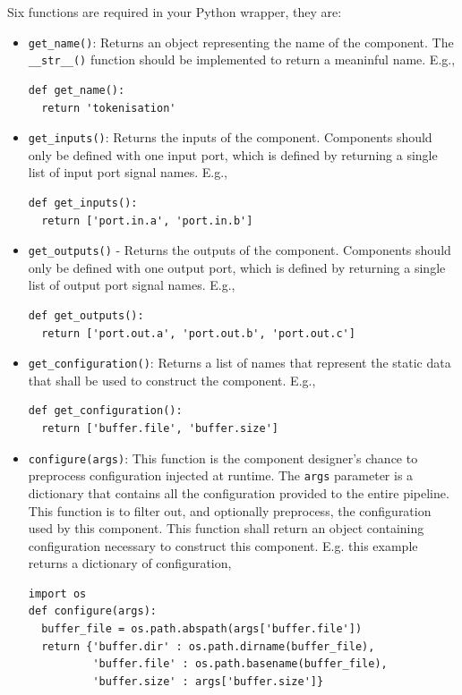 Six functions are required in your Python wrapper, they are:
\begin{itemize}
\item \texttt{get\_name()}: Returns an object representing the name of the component. The \texttt{\_\_str\_\_()} function should be implemented to return a meaninful name. E.g.,
\begin{verbatim}
def get_name():
  return 'tokenisation'
\end{verbatim}
\item \texttt{get\_inputs()}: Returns the inputs of the component. Components should only be defined with one input port, which is defined by returning a single list of input port signal names. E.g.,
\begin{verbatim}
def get_inputs():
  return ['port.in.a', 'port.in.b']
\end{verbatim}
\item \texttt{get\_outputs()} - Returns the outputs of the component. Components should only be defined with one output port, which is defined by returning a single list of output port signal names. E.g.,
\begin{verbatim}
def get_outputs():
  return ['port.out.a', 'port.out.b', 'port.out.c']
\end{verbatim}
\item \texttt{get\_configuration()}: Returns a list of names that represent the static data that shall be used to construct the component. E.g.,
\begin{verbatim}
def get_configuration():
  return ['buffer.file', 'buffer.size']
\end{verbatim}
\item \texttt{configure(args)}: This function is the component designer's chance to preprocess configuration injected at runtime. The \texttt{args} parameter is a dictionary that contains all the configuration provided to the entire pipeline. This function is to filter out, and optionally preprocess, the configuration used by this component. This function shall return an object containing configuration necessary to construct this component. E.g. this example returns a dictionary of configuration,
\begin{verbatim}
import os
def configure(args):
  buffer_file = os.path.abspath(args['buffer.file'])
  return {'buffer.dir' : os.path.dirname(buffer_file),
          'buffer.file' : os.path.basename(buffer_file),
          'buffer.size' : args['buffer.size']}
\end{verbatim}

\end{itemize}

